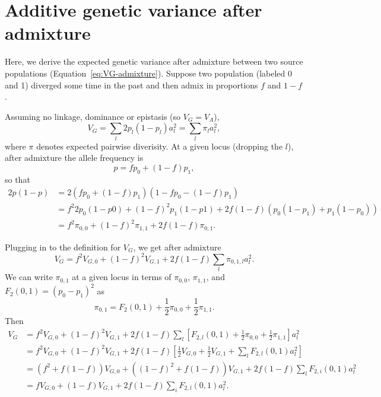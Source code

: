 \documentclass{article}
\begin{document}
\section{Additive genetic variance after admixture}\label{sec:VG-admixture}

Here, we derive the expected genetic variance after admixture between two
source populations (Equation~\ref{eq:VG-admixture}). Suppose two population
(labeled 0 and 1) diverged some time in the past and then admix in proportions
$f$ and $1-f$.

Assuming no linkage, dominance or epistasis (so \(V_G=V_A\)),
\[V_G = \sum_l 2p_l(1-p_l)a_l^2 = \sum_l \pi_l a_l^2,\]
where $\pi$ denotes expected pairwise diverisity.
At a given locus (dropping the $l$), after admixture the allele frequency is
\[p=f p_0 + (1-f) p_1,\]
so that
\begin{align*}
    2p(1-p) & = 2(f p_0 + (1-f) p_1)(1 - f p_0 - (1-f) p_1) \\
    & = f^2 2p_0(1-p0) + (1-f)^2 p_1(1-p1) + 2f(1-f) (p_0(1-p_1) + p_1(1-p_0)) \\
    & = f^2 \pi_{0,0} + (1-f)^2 \pi_{1,1} + 2f(1-f)\pi_{0,1}.
\end{align*}

Plugging in to the definition for $V_G$, we get after admixture
\[V_G = f^2 V_{G,0} + (1-f)^2 V_{G,1} + 2f(1-f)\sum_l \pi_{0,1,l}a_l^2.\]
We can write $\pi_{0,1}$ at a given locus in terms of $\pi_{0,0}$, $\pi_{1,1}$,
and $F_2(0,1)=(p_0-p_1)^2$ as \citep{peter2016admixture}
\[\pi_{0,1} = F_2(0,1) + \frac{1}{2}\pi_{0,0} + \frac{1}{2}\pi_{1,1}.\]
Then
\begin{align*}
    V_G & = f^2 V_{G,0} + (1-f)^2 V_{G,1} + 2f(1-f)\sum_l \left[F_{2,l}(0,1)
    + \frac{1}{2}\pi_{0,0} + \frac{1}{2}\pi_{1,1}\right] a_l^2 \\
    & = f^2 V_{G,0} + (1-f)^2 V_{G,1} + 2f(1-f)\left[\frac{1}{2}V_{G,0} 
    + \frac{1}{2}V_{G,1} + \sum_l F_{2,l}(0,1)a_l^2\right] \\
    & = \left(f^2 + f(1-f)\right) V_{G,0} + \left((1-f)^2 + f(1-f)\right)V_{G,1}
    + 2f(1-f) \sum_l F_{2,i}(0,1)a_l^2 \\
    & = f V_{G,0} + (1-f)V_{G,1} + 2f(1-f)\sum_i F_{2,l}(0,1)a_l^2.
\end{align*}
\end{document}
